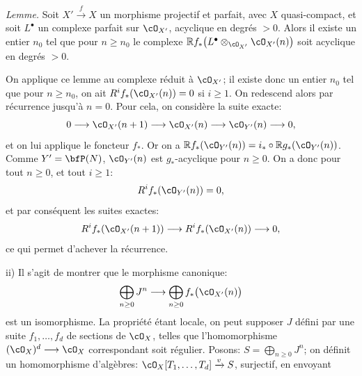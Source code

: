 \textit{Lemme.} Soit \(X'\xrightarrow{f}X\) un morphisme projectif et parfait, avec \(X\) quasi-compact, et soit \(L^\bullet\) un complexe parfait sur \(\cO_{X'}\), acyclique en degrés \(>0\). Alors il existe un entier \(n_0\) tel que pour \(n\ge n_0\) le complexe \(\mathbb Rf_*\bigl(L^\bullet\otimes_{\cO_{X'}}\cO_{X'}(n)\bigr)\) soit acyclique en degrés \(>0\).

On applique ce lemme au complexe réduit à \(\cO_{X'}\); il existe donc un entier \(n_0\) tel que pour \(n\ge n_0\), on ait \(R^if_*(\cO_{X'}(n))=0\) si \(i\ge1\). On redescend alors par récurrence jusqu'à \(n=0\). Pour cela, on considère la suite exacte:
\[
0\longrightarrow
\cO_{X'}(n+1)
\longrightarrow
\cO_{X'}(n)
\longrightarrow
\cO_{Y'}(n)
\longrightarrow0,
\]
et on lui applique le foncteur \(f_*\). Or on a \(\mathbb Rf_*(\cO_{Y'}(n))=i_*\circ\mathbb Rg_*(\cO_{Y'}(n))\). Comme \(Y'=\bfP(N)\), \(\cO_{Y'}(n)\) est \(g_*\)-acyclique pour \(n\ge0\). On a donc pour tout \(n\ge0\), et tout \(i\ge1\):
\[
R^if_*(\cO_{Y'}(n))=0,
\]
et par conséquent les suites exactes:
\[
R^if_*(\cO_{X'}(n+1))
\longrightarrow
R^if_*(\cO_{X'}(n))
\longrightarrow0,
\]
ce qui permet d'achever la récurrence.

ii) Il s'agit de montrer que le morphisme canonique:
\[
\bigoplus_{n\ge0}J^n
\longrightarrow
\bigoplus_{n\ge0}f_*\bigl(\cO_{X'}(n)\bigr)
\]
est un isomorphisme. La propriété étant locale, on peut supposer \(J\) défini par une suite \(f_1,\ldots,f_d\) de sections de \(\cO_X\), telles que l'homomorphisme \((\cO_X)^d\longrightarrow\cO_X\) correspondant soit régulier. Posons: \(S=\bigoplus_{n\ge0}J^n\); on définit un homomorphisme d'algèbres: \(\cO_X[T_1,\ldots,T_d]\xrightarrow{v}S\), surjectif, en envoyant 
